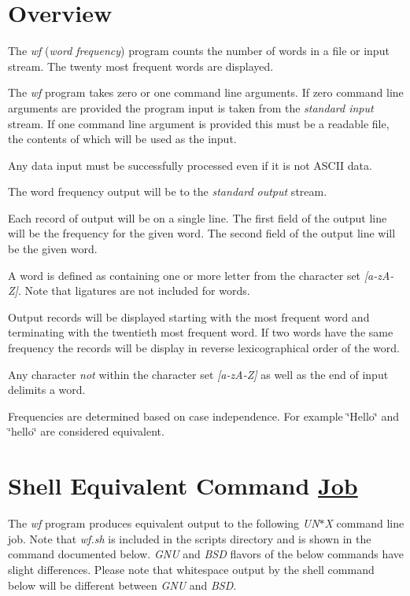 \section*{Overview}


\begin{DoxyItemize}
\item The {\itshape wf} ({\itshape word frequency}) program counts the number of words in a file or input stream. The twenty most frequent words are displayed.
\item The {\itshape wf} program takes zero or one command line arguments. If zero command line arguments are provided the program input is taken from the {\itshape standard input} stream. If one command line argument is provided this must be a readable file, the contents of which will be used as the input.
\item Any data input must be successfully processed even if it is not A\+S\+C\+II data.
\item The word frequency output will be to the {\itshape standard output} stream.
\item Each record of output will be on a single line. The first field of the output line will be the frequency for the given word. The second field of the output line will be the given word.
\item A word is defined as containing one or more letter from the character set {\itshape \mbox{[}a-\/z\+A-\/Z\mbox{]}}. Note that ligatures are not included for words.
\item Output records will be displayed starting with the most frequent word and terminating with the twentieth most frequent word. If two words have the same frequency the records will be display in reverse lexicographical order of the word.
\item Any character {\itshape not} within the character set {\itshape \mbox{[}a-\/z\+A-\/Z\mbox{]}} as well as the end of input delimits a word.
\item Frequencies are determined based on case independence. For example \char`\"{}\+Hello\char`\"{} and \char`\"{}hello\char`\"{} are considered equivalent.
\end{DoxyItemize}

\section*{Shell Equivalent Command \mbox{\hyperlink{structJob}{Job}}}

The {\itshape wf} program produces equivalent output to the following {\itshape U\+N$\ast$X} command line job. Note that {\itshape wf.\+sh} is included in the scripts directory and is shown in the command documented below. {\itshape G\+NU} and {\itshape B\+SD} flavors of the below commands have slight differences. Please note that whitespace output by the shell command below will be different between {\itshape G\+NU} and {\itshape B\+SD}. 




